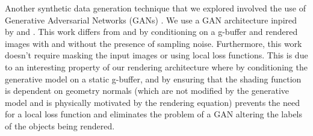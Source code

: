 \documentclass[10pt,twocolumn,letterpaper]{article}
\newcommand{\tompson}[1]{{\color{green} JT: #1}}
\begin{document}
Another synthetic data generation technique that we explored involved the use of Generative Adversarial Networks (GANs) \cite{2014arXiv1409.7495G}.  We use a GAN architecture inpired by \cite{DBLP:journals/corr/ShrivastavaPTSW16} and \cite{Bousmalis2016UnsupervisedPD}. This work differs from \cite{Bousmalis2016UnsupervisedPD} and \cite{DBLP:journals/corr/ShrivastavaPTSW16} by conditioning on a g-buffer and rendered images with and without the presence of sampling noise. Furthermore, this work doesn't require masking the input images or using local loss functions. This is due to an interesting property of our rendering architecture where by conditioning the generative model on a static g-buffer, and by ensuring that the shading function is dependent on geometry normals (which are not modified by the generative model and is physically motivated by the rendering equation) 
prevents the need for a local loss function and eliminates the problem of a GAN altering the labels of the objects being rendered.

\end{document}

